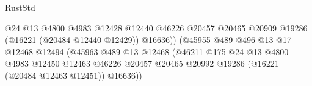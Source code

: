 \begin{lexlean}{RustStd}
\begin{coremodule}
                                                            @24
                                                            @13
                                                            @4800
                                                            @4983
                                                            @12428
                                                            @12440
                                                            @46226
                                                            @20457
                                                            @20465
                                                            @20909
                                                            @19286
                                                            (@16221 (@20484 @12440 @12429))
                                                            @16636))
                                                        (@45955
                                                          @489
                                                          @496
                                                          @13
                                                          @17
                                                          @12468
                                                          @12494
                                                          (@45963
                                                            @489
                                                            @13
                                                            @12468
                                                            (@46211
                                                              @175
                                                              @24
                                                              @13
                                                              @4800
                                                              @4983
                                                              @12450
                                                              @12463
                                                              @46226
                                                              @20457
                                                              @20465
                                                              @20992
                                                              @19286
                                                              (@16221 (@20484 @12463 @12451))
                                                              @16636))

\end{coremodule}
\end{lexlean}

